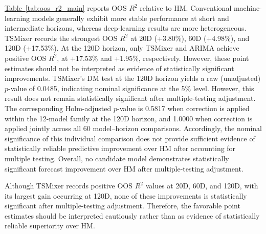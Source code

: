 \documentclass[runningheads,orivec]{llncs}
\begin{document}
\hyperref[tab:oos_r2_main]{Table~\ref*{tab:oos_r2_main}} reports OOS $R^2$ relative to HM. Conventional machine-learning models generally exhibit more stable performance at short and intermediate horizons, whereas deep-learning results are more heterogeneous. TSMixer records the strongest OOS $R^2$ at 20D (+3.80\%), 60D (+4.98\%), and 120D (+17.53\%). At the 120D horizon, only TSMixer and ARIMA achieve positive OOS $R^2$, at +17.53\% and +1.95\%, respectively. However, these point estimates should not be interpreted as evidence of statistically significant improvements. TSMixer's DM test at the 120D horizon yields a raw (unadjusted) $p$-value of 0.0485, indicating nominal significance at the 5\% level. However, this result does not remain statistically significant after multiple-testing adjustment. The corresponding Holm-adjusted $p$-value is 0.5817 when correction is applied within the 12-model family at the 120D horizon, and 1.0000 when correction is applied jointly across all 60 model--horizon comparisons. Accordingly, the nominal significance of this individual comparison does not provide sufficient evidence of statistically reliable predictive improvement over HM after accounting for multiple testing. Overall, no candidate model demonstrates statistically significant forecast improvement over HM after multiple-testing adjustment.

Although TSMixer records positive OOS $R^2$ values at 20D, 60D, and 120D, with its largest gain occurring at 120D, none of these improvements is statistically significant after multiple-testing adjustment. Therefore, the favorable point estimates should be interpreted cautiously rather than as evidence of statistically reliable superiority over HM.
\end{document}
